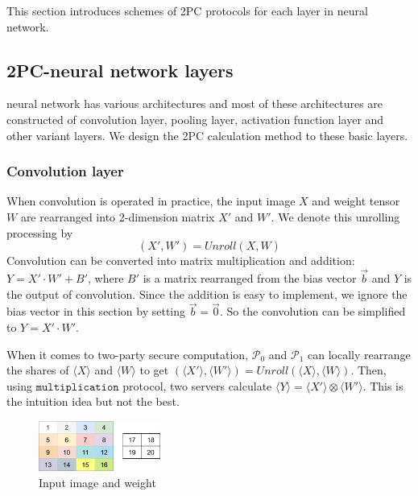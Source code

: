\documentclass[letterpaper]{article} %
\begin{document}
       This section introduces schemes
       of 2PC protocols for each layer in neural network.
       

    \subsection{2PC-neural network layers}
    
    neural network has various architectures and 
    most of these architectures are constructed of convolution layer, 
    pooling layer, activation function layer and other variant layers. 
    We design the 2PC calculation method to these basic layers.
    
    \subsubsection{Convolution layer}


    When convolution is operated in practice,
    the input image $X$ and weight tensor $W$ 
    are rearranged into 2-dimension matrix $X'$ and $W'$. 
    We denote this unrolling processing by 
    $$(X',W')=Unroll(X,W)$$
    Convolution can be converted into matrix multiplication and addition:
    $Y=X'\cdot W'+B'$, where $B'$ is a matrix rearranged from the bias vector $\overrightarrow{b}$ and 
    $Y$ is the output of convolution.
    Since the addition is easy to implement, we ignore the bias vector in this section by setting $\overrightarrow{b}=\overrightarrow{0}$.
    So the convolution can be simplified to $Y=X'\cdot W'$.

    When it comes to two-party secure computation, 
    $\mathcal{P}_{0}$ and $\mathcal{P}_{1}$ can locally
    rearrange the shares of $\langle X\rangle$ and $\langle W\rangle$ to get 
    $(\langle X'\rangle,\langle W'\rangle)=Unroll(\langle X\rangle,\langle W\rangle)$.
    Then, using $\mathtt{multiplication}$ protocol, 
    two servers calculate $\langle Y\rangle=\langle X'\rangle\otimes \langle W'\rangle$.    
    This is the intuition idea but not the best.

    \begin{figure}[htbp]
        \centering
        \includegraphics[width=4cm]{new_unrolling.png}
        \caption{Input image and weight}
        \label{input image and weight}
    \end{figure}
    
\end{document}

